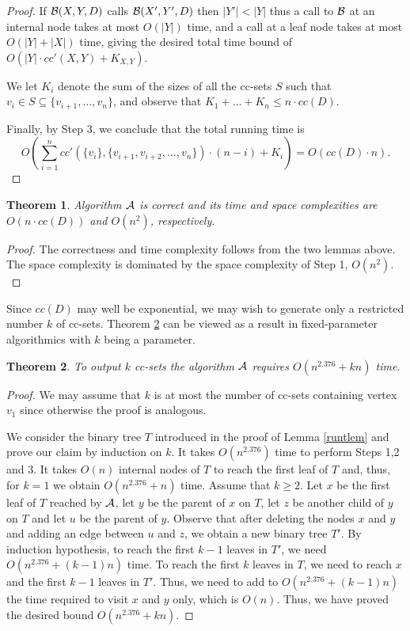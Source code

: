 \documentclass[11pt]{article}
\newcommand{\2}{\vspace{0.2 cm}}
\newtheorem{theorem}{Theorem}[section]
\begin{document}
\begin{proof}
If ${\cal B}(X,Y,D)$ calls ${\cal B}(X',Y',D)$ then $|Y'|<|Y|$ thus
a call to ${\cal B}$ at an internal node takes at most  $O(|Y|)$ time,
and a call at a leaf node takes at most $O(|Y|+|X|)$ time, giving
the desired total time bound of $O(|Y| \cdot cc'(X,Y)+K_{X,Y})$.

We let $K_i$ denote the sum of the sizes of all the cc-sets $S$ such
that $v_i\in S\subseteq \{v_{i+1},\ldots,v_n\}$, and observe that
$K_1+\ldots +K_n\leq n\cdot cc(D)$.

Finally, by Step 3, we conclude that the total running time is
$$O\left(\sum_{i=1}^{n}cc'(\{v_i\},\{v_{i+1},v_{i+2},\ldots ,v_n\})\cdot
(n-i)+K_i\right)=O(cc(D)\cdot n).$$\end{proof}

\begin{theorem}\label{maint}
Algorithm $\cal A$ is correct and its time and space complexities
are $O(n\cdot cc(D))$ and $O(n^2)$, respectively.
\end{theorem}
\begin{proof} The correctness and time complexity follows from the two lemmas
above. The space complexity is dominated by the space complexity of
Step 1, $O(n^2).$\end{proof}

\2

Since $cc(D)$ may well be exponential, we may wish to generate only
a restricted number $k$ of cc-sets. Theorem \ref{kccsets} can be
viewed as a result in fixed-parameter algorithmics \cite{downey1999}
with $k$ being a parameter.

\begin{theorem}\label{kccsets}
To output $k$ cc-sets the algorithm $\cal A$ requires $O(n^{2.376}+kn)$
time.
\end{theorem}
\begin{proof} We may assume that $k$ is at most the number
of cc-sets containing vertex $v_1$ since otherwise the proof is
analogous.

We consider the binary tree $T$ introduced in the proof of Lemma
\ref{runtlem} and prove our claim by induction on $k$. It takes
$O(n^{2.376})$ time to perform Steps 1,2 and 3. It takes $O(n)$ internal
nodes of $T$ to reach the first leaf of $T$ and, thus, for $k=1$ we
obtain $O(n^{2.376}+n)$ time. Assume that $k\ge 2$. Let $x$ be the first
leaf of $T$ reached by $\cal A$, let $y$ be the parent of $x$ on
$T$, let $z$ be another child of $y$ on $T$ and let $u$ be the
parent of $y$. Observe that after deleting the nodes $x$ and $y$ and
adding an edge between $u$ and $z$, we obtain a new binary tree
$T'$. By induction hypothesis, to reach the first $k-1$ leaves in
$T'$, we need $O(n^{2.376}+(k-1)n)$ time. To reach the first $k$ leaves in
$T$, we need to reach $x$ and the first $k-1$ leaves in $T'$. Thus,
we need to add to $O(n^{2.376}+(k-1)n)$ the time required to visit $x$ and
$y$ only, which is $O(n).$ Thus, we have proved the desired bound
$O(n^{2.376}+kn)$.
\end{proof}
\end{document}
